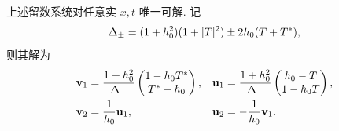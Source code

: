 \begin{lemma}\label{lem:direct-solve}
上述留数系统对任意实 $x,t$ 唯一可解. 记
\begin{equation}\label{eq:delta-pair}
\Delta_\pm=(1+h_0^2)(1+|T|^2)\pm2h_0(T+{T}^{*}),
\end{equation}
则其解为
\begin{align}
\mathbf v_1&=\dfrac{1+h_0^2}{\Delta_-}
\begin{pmatrix}1-h_0{T}^{*}\\{T}^{*}-h_0\end{pmatrix},&
\mathbf u_1&=\dfrac{1+h_0^2}{\Delta_-}
\begin{pmatrix}h_0-T\\1-h_0T\end{pmatrix},\label{eq:direct-vu1}\\
\mathbf v_2&=\dfrac{1}{h_0}\mathbf u_1,&
\mathbf u_2&=-\dfrac{1}{h_0}\mathbf v_1.\label{eq:direct-vu2}
\end{align}
\end{lemma}

